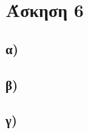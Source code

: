 \documentclass[11pt,a4paper]{book}
\begin{document}
\section*{Άσκηση 6}
\subsection*{α)}
\subsection*{β)}
\subsection*{γ)}
\end{document}
